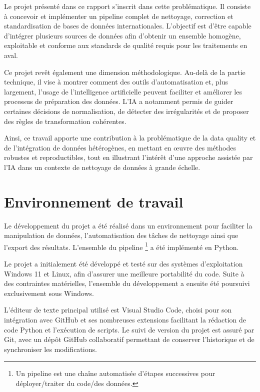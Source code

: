 \documentclass[a4paper, 12pt, twoside]{article}
\begin{document}
Le projet présenté dans ce rapport s’inscrit dans cette problématique. Il consiste à concevoir et implémenter un pipeline complet de nettoyage, correction et standardisation de bases de données internationales. L’objectif est d’être capable d’intégrer plusieurs sources de données afin d’obtenir un ensemble homogène, exploitable et conforme aux standards de qualité requis pour les traitements en aval.

Ce projet revêt également une dimension méthodologique. Au-delà de la partie technique, il vise à montrer comment des outils d’automatisation et, plus largement, l’usage de l’intelligence artificielle peuvent faciliter et améliorer les processus de préparation des données. L’IA a notamment permis de guider certaines décisions de normalisation, de détecter des irrégularités et de proposer des règles de transformation cohérentes.

Ainsi, ce travail apporte une contribution à la problématique de la data quality et de l’intégration de données hétérogènes, en mettant en œuvre des méthodes robustes et reproductibles, tout en illustrant l’intérêt d’une approche assistée par l’IA dans un contexte de nettoyage de données à grande échelle.

\newpage
\section{Environnement de travail}
Le développement du projet a été réalisé dans un environnement pour faciliter la manipulation de données, l’automatisation des tâches de nettoyage ainsi que l’export des résultats. L’ensemble du pipeline
\footnote{Un pipeline est une chaîne automatisée d’étapes successives pour déployer/traiter du code/des données.} a été implémenté en Python.

Le projet a initialement été développé et testé sur des systèmes d’exploitation Windows 11 et Linux, afin d’assurer une meilleure portabilité du code. Suite à des contraintes matérielles, l’ensemble du développement a ensuite été poursuivi exclusivement sous Windows.

L’éditeur de texte principal utilisé est Visual Studio Code, choisi pour son intégration avec GitHub et ses nombreuses extensions facilitant la rédaction de code Python et l’exécution de scripts. Le suivi de version du projet est assuré par Git, avec un dépôt GitHub collaboratif permettant de conserver l’historique et de synchroniser les modifications.
\end{document}
